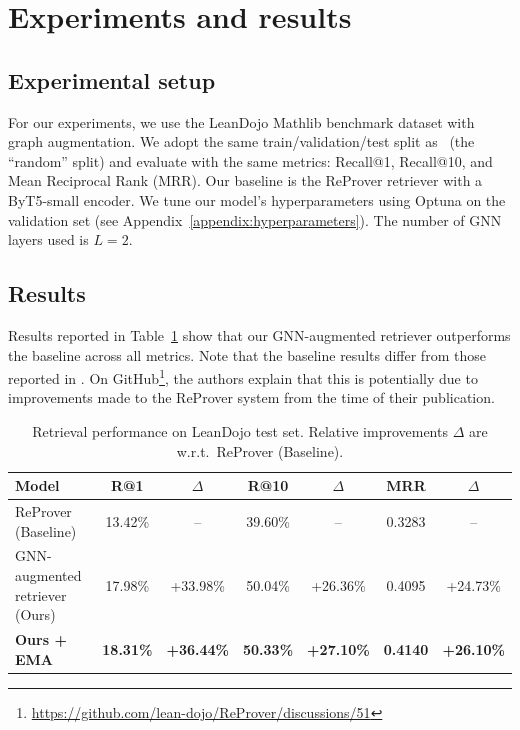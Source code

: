 \section{Experiments and results}

\subsection{Experimental setup}
For our experiments, we use the LeanDojo Mathlib benchmark dataset with graph augmentation. We adopt the same train/validation/test split as~\citep{yang2023leandojo} (the “random” split) and evaluate with the same metrics: Recall@1, Recall@10, and Mean Reciprocal Rank (MRR). Our baseline is the ReProver retriever with a ByT5-small encoder. We tune our model’s hyperparameters using Optuna on the validation set (see Appendix~\ref{appendix:hyperparameters}). The number of GNN layers used is $L=2$.

\subsection{Results}
Results reported in Table~\ref{tab:results} show that our GNN-augmented retriever outperforms the baseline across all metrics. Note that the baseline results differ from those reported in \citep{yang2023leandojo}. On GitHub\footnote{\url{https://github.com/lean-dojo/ReProver/discussions/51}}, the authors explain that this is potentially due to improvements made to the ReProver system from the time of their publication.

\begin{table}[h]
\centering
\begin{tabularx}{\textwidth}{X c c c c c c}
\toprule
Model & R@1 & $\Delta$ & R@10 & $\Delta$ & MRR & $\Delta$ \\

\midrule
ReProver (Baseline) & 13.42\% & -- & 39.60\% & -- & 0.3283 & -- \\
GNN-augmented retriever (Ours) & 17.98\% & +33.98\% & 50.04\% & +26.36\% & 0.4095 & +24.73\% \\
\textbf{Ours + EMA} & \textbf{18.31\%} & \textbf{+36.44\%} & \textbf{50.33\%} & \textbf{+27.10\%} & \textbf{0.4140} & \textbf{+26.10\%} \\
\bottomrule
\end{tabularx}
\caption{Retrieval performance on LeanDojo test set. Relative improvements $\Delta$ are w.r.t.~ReProver (Baseline).\label{tab:results}}
\end{table}

